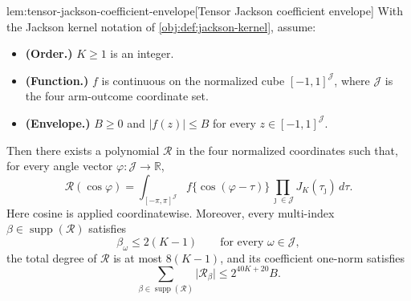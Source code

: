 \documentclass[11pt]{article}
\begin{document}
\begin{lemmav}{lem:tensor-jackson-coefficient-envelope}[Tensor Jackson coefficient envelope]
With the Jackson kernel notation of \cref{obj:def:jackson-kernel}, assume:
\begin{itemize}
\item \textbf{(Order.)} \(K\ge 1\) is an integer.
\item \textbf{(Function.)} \(f\) is continuous on the normalized cube \([-1,1]^{\mathcal J}\), where \(\mathcal J\) is the four arm-outcome coordinate set.
\item \textbf{(Envelope.)} \(B\ge 0\) and \(\lvert f(z)\rvert\le B\) for every \(z\in[-1,1]^{\mathcal J}\).
\end{itemize}
Then there exists a polynomial \(\mathcal R\) in the four normalized coordinates such that, for every angle vector \(\varphi:\mathcal J\to\mathbb R\),
\[
\mathcal R(\cos\varphi)
=
\int_{[-\pi,\pi]^{\mathcal J}}
f\{\cos(\varphi-\tau)\}
\prod_{\jmath\in\mathcal J}J_K(\tau_\jmath)\,d\tau .
\]
Here cosine is applied coordinatewise. Moreover, every multi-index \(\beta\in\operatorname{supp}(\mathcal R)\) satisfies
\[
\beta_\omega\le 2(K-1)
\qquad\text{for every }\omega\in\mathcal J,
\]
the total degree of \(\mathcal R\) is at most \(8(K-1)\), and its coefficient one-norm satisfies
\[
\sum_{\beta\in\operatorname{supp}(\mathcal R)}
\lvert \mathcal R_\beta\rvert
\le 2^{40K+20}B .
\]
\end{lemmav}
\end{document}
